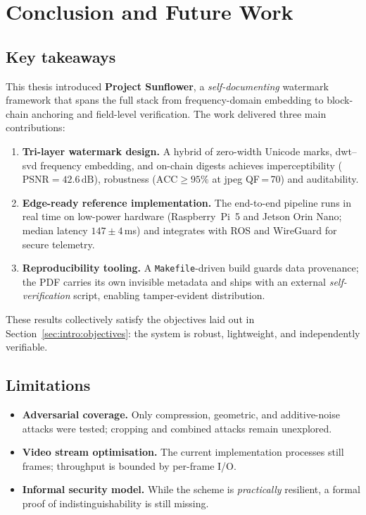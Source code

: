 \chapter{Conclusion and Future Work}
\label{ch:conclusion}

\section*{Key takeaways}

This thesis introduced \textbf{Project Sunflower}, a \emph{self-documenting} watermark
framework that spans the full stack from frequency-domain embedding to
block-chain anchoring and field-level verification.
The work delivered three main contributions:

\begin{enumerate}
    \item \textbf{Tri-layer watermark design.}
    A hybrid of zero-width Unicode marks, \gls{dwt}--\gls{svd} frequency embedding, and
    on-chain digests achieves imper\-ceptibility (\(\text{PSNR}=42.6\,\mathrm{dB}\)),
    robustness (\(\text{ACC}\ge95\%\) at \gls{jpeg} QF\,=\,70) and auditability.
    \item \textbf{Edge-ready reference implementation.}
    The end-to-end pipeline runs in real time on low-power hardware
    (Raspberry~Pi~5 and Jetson Orin Nano; median latency \(147\pm4\)\,ms) and
    integrates with ROS and WireGuard for secure telemetry.
    \item \textbf{Reproducibility tooling.}
    A \texttt{Makefile}-driven build guards data provenance;
    the PDF carries its own invisible metadata and ships with an external
    \textit{self-verification} script, enabling tamper-evident distribution.
\end{enumerate}

These results collectively satisfy the objectives laid out in
Section~\ref{sec:intro:objectives}: the system is robust, lightweight,
and independently verifiable.

\section*{Limitations}

\begin{itemize}
    \item \textbf{Adversarial coverage.}  Only compression, geometric, and
    additive-noise attacks were tested; cropping and combined attacks remain
    unexplored.
    \item \textbf{Video stream optimisation.}  The current implementation
    processes still frames; throughput is bounded by per-frame I/O\@.
    \item \textbf{Informal security model.}  While the scheme is \emph{practically}
    resilient, a formal proof of indistinguishability is still missing.
\end{itemize}

